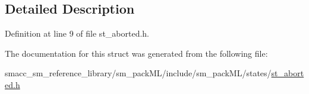 \subsection{Detailed Description}


Definition at line 9 of file st\+\_\+aborted.\+h.



The documentation for this struct was generated from the following file\+:\begin{DoxyCompactItemize}
\item 
smacc\+\_\+sm\+\_\+reference\+\_\+library/sm\+\_\+pack\+M\+L/include/sm\+\_\+pack\+M\+L/states/\hyperlink{st__aborted_8h}{st\+\_\+aborted.\+h}\end{DoxyCompactItemize}
